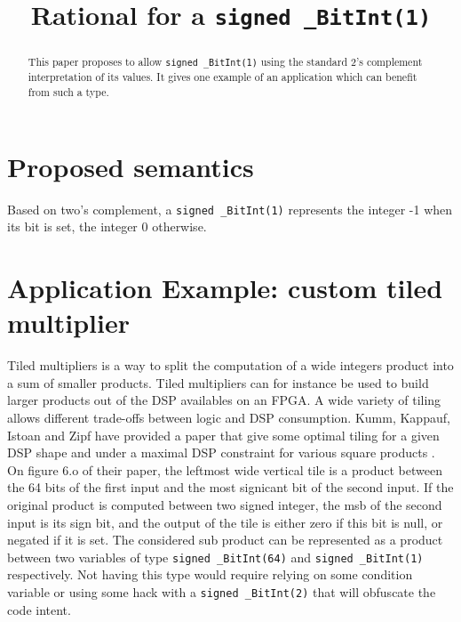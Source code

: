 \documentclass[a4paper]{article}
\title{Rational for a  \texttt{signed \_BitInt(1)}}
\author{}
\begin{document}
    \maketitle

    \begin{abstract}
        This paper proposes to allow \texttt{signed \_BitInt(1)} using the standard 2's complement interpretation of its values.
        It gives one example of an application which can benefit from such a type.
    \end{abstract}

    \tableofcontents
    \section{Proposed semantics}
    Based on two's complement, a \texttt{signed \_BitInt(1)} represents the integer -1 when its bit is set, the integer 0 otherwise. 

    \section{Application Example: custom tiled multiplier}
    Tiled multipliers is a way to split the computation of a wide integers product into a sum of smaller products.
    Tiled multipliers can for instance be used to build larger products out of the DSP availables on an FPGA.
    A wide variety of tiling allows different trade-offs between logic and DSP consumption.
    Kumm, Kappauf, Istoan and Zipf have provided a paper that give some optimal tiling for a given DSP shape and under a maximal DSP constraint for various square products \cite{kummMult}.
    On figure 6.o of their paper, the leftmost wide vertical tile is a product between the 64 bits of the first input and the most signicant bit of the second input.
    If the original product is computed between two signed integer, the msb of the second input is its sign bit, and the output of the tile is either zero if this bit is null, or negated if it is set.
    The considered sub product can be represented as a product between two variables of type \texttt{signed \_BitInt(64)} and \texttt{signed \_BitInt(1)} respectively.
    Not having this type would require relying on some condition variable or using some hack with a \texttt{signed \_BitInt(2)} that will obfuscate the code intent.

   
\printbibliography
    
\end{document}
